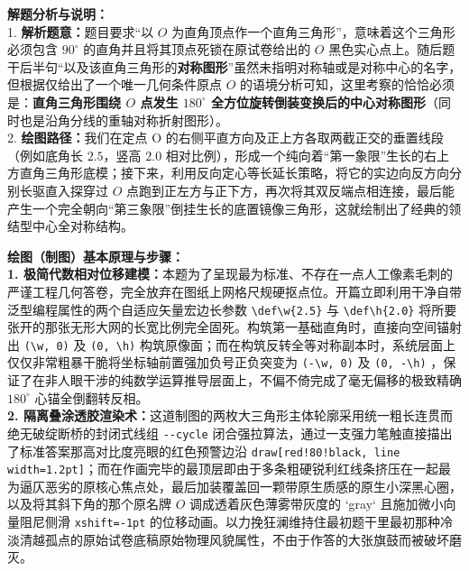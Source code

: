 {\small\color{gray}
\textbf{解题分析与说明：}\\
1. \textbf{解析题意：}题目要求“以 $O$ 为直角顶点作一个直角三角形”，意味着这个三角形必须包含 $90^\circ$ 的直角并且将其顶点死锁在原试卷给出的 $O$ 黑色实心点上。随后题干后半句“以及该直角三角形的\textbf{对称图形}”虽然未指明对称轴或是对称中心的名字，但根据仅给出了一个唯一几何条件原点 $O$ 的语境分析可知，这里考察的恰恰必须是：\textbf{直角三角形围绕 $O$ 点发生 $180^\circ$ 全方位旋转倒装变换后的中心对称图形}（同时也是沿角分线的重轴对称折射图形）。\\
2. \textbf{绘图路径：}我们在定点 O 的右侧平直方向及正上方各取两截正交的垂置线段（例如底角长 $2.5$，竖高 $2.0$ 相对比例），形成一个纯向着“第一象限”生长的右上方直角三角形底模；接下来，利用反向定心等长延长策略，将它的实边向反方向分别长驱直入探穿过 $O$ 点跑到正左方与正下方，再次将其双反端点相连接，最后能产生一个完全朝向“第三象限”倒挂生长的底置镜像三角形，这就绘制出了经典的领结型中心全对称结构。
}

\vspace{0.6cm}

{\small\color{blue!70!black}
\textbf{绘图（制图）基本原理与步骤：}\\
\textbf{1. 极简代数相对位移建模：}本题为了呈现最为标准、不存在一点人工像素毛刺的严谨工程几何答卷，完全放弃在图纸上网格尺规硬抠点位。开篇立即利用干净自带泛型编程属性的两个自适应矢量宏边长参数 \texttt{\textbackslash def\textbackslash w\{2.5\}} 与 \texttt{\textbackslash def\textbackslash h\{2.0\}} 将所要张开的那张无形大网的长宽比例完全固死。构筑第一基础直角时，直接向空间锚射出 \texttt{(\textbackslash w, 0)} 及 \texttt{(0, \textbackslash h)} 构筑原像面；而在构筑反转全等对称副本时，系统层面上仅仅非常粗暴干脆将坐标轴前置强加负号正负突变为 \texttt{(-\textbackslash w, 0)} 及 \texttt{(0, -\textbackslash h)} ，保证了在非人眼干涉的纯数学运算推导层面上，不偏不倚完成了毫无偏移的极致精确 $180^\circ$ 心锚全倒翻转反相。\\
\textbf{2. 隔离叠涂透胶渲染术：}这道制图的两枚大三角形主体轮廓采用统一粗长连贯而绝无破绽断桥的封闭式线组 \texttt{-{}-cycle} 闭合强拉算法，通过一支强力笔触直接描出了标准答案那高对比度亮眼的红色预警边沿 \texttt{draw[red!80!black, line width=1.2pt]}；而在作画完毕的最顶层即由于多条粗硬锐利红线条挤压在一起最为逼仄恶劣的原核心焦点处，最后加装覆盖回一颗带原生质感的原生小深黑心圈，以及将其斜下角的那个原名牌 $O$ 调成透着灰色薄雾带灰度的 `gray` 且施加微小向量阻尼侧滑 \texttt{xshift=-1pt} 的位移动画。以力挽狂澜维持住最初题干里最初那种冷淡清越孤点的原始试卷底稿原始物理风貌属性，不由于作答的大张旗鼓而被破坏磨灭。
}

